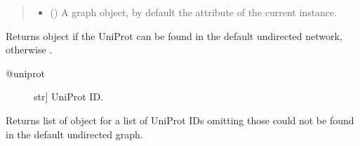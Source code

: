 \documentclass[letterpaper,10pt,english]{sphinxmanual}
\begin{document}
\begin{fulllineitems}
\begin{fulllineitems}
\begin{quote}
\begin{description}
\begin{itemize}
\item {} 
 () \textendash{} A graph object, by default the  attribute of
the current instance.

\end{itemize}

\end{description}\end{quote}

\end{fulllineitems}


\begin{fulllineitems}
\label{\detokenize{main:pypath.main.PyPath.transcription_factors}}
\end{fulllineitems}


\begin{fulllineitems}
\label{\detokenize{main:pypath.main.PyPath.translate_refsdir}}
\end{fulllineitems}


\begin{fulllineitems}
\label{\detokenize{main:pypath.main.PyPath.uniprot}}
Returns  object if the UniProt
can be found in the default undirected network,
otherwise .
\begin{description}
\item[{@uniprot}] \leavevmode{[}str{]}
UniProt ID.

\end{description}

\end{fulllineitems}


\begin{fulllineitems}
\label{\detokenize{main:pypath.main.PyPath.uniprots}}
Returns list of  object
for a list of UniProt IDs omitting those
could not be found in the default
undirected graph.


\end{fulllineitems}
\end{fulllineitems}
\end{document}
